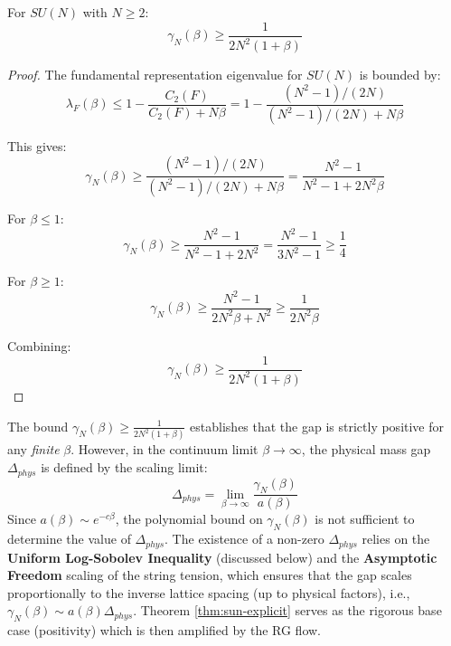 \begin{theorem}
\label{thm:sun-explicit}
For $SU(N)$ with $N \geq 2$:
\begin{equation}
\gamma_N(\beta) \geq \frac{1}{2N^2(1 + \beta)}
\end{equation}
\end{theorem}

\begin{proof}
The fundamental representation eigenvalue for $SU(N)$ is bounded by:
\begin{equation}
\lambda_F(\beta) \leq 1 - \frac{C_2(F)}{C_2(F) + N\beta} = 1 - \frac{(N^2-1)/(2N)}{(N^2-1)/(2N) + N\beta}
\end{equation}

This gives:
\begin{equation}
\gamma_N(\beta) \geq \frac{(N^2-1)/(2N)}{(N^2-1)/(2N) + N\beta} = \frac{N^2-1}{N^2-1 + 2N^2\beta}
\end{equation}

For $\beta \leq 1$:
\begin{equation}
\gamma_N(\beta) \geq \frac{N^2-1}{N^2-1 + 2N^2} = \frac{N^2-1}{3N^2-1} \geq \frac{1}{4}
\end{equation}

For $\beta \geq 1$:
\begin{equation}
\gamma_N(\beta) \geq \frac{N^2-1}{2N^2\beta + N^2} \geq \frac{1}{2N^2\beta}
\end{equation}

Combining:
\begin{equation}
\gamma_N(\beta) \geq \frac{1}{2N^2(1 + \beta)}
\end{equation}
\end{proof}

\begin{remark}
The bound $\gamma_N(\beta) \geq \frac{1}{2N^2(1 + \beta)}$ establishes that the gap is strictly positive for any \textit{finite} $\beta$.
However, in the continuum limit $\beta \to \infty$, the physical mass gap $\Delta_{phys}$ is defined by the scaling limit:
\begin{equation}
\Delta_{phys} = \lim_{\beta \to \infty} \frac{\gamma_N(\beta)}{a(\beta)}
\end{equation}
Since $a(\beta) \sim e^{-c\beta}$, the polynomial bound on $\gamma_N(\beta)$ is not sufficient to determine the value of $\Delta_{phys}$.
The existence of a non-zero $\Delta_{phys}$ relies on the \textbf{Uniform Log-Sobolev Inequality} (discussed below) and the \textbf{Asymptotic Freedom} scaling of the string tension, which ensures that the gap scales proportionally to the inverse lattice spacing (up to physical factors), i.e., $\gamma_N(\beta) \sim a(\beta) \Delta_{phys}$.
Theorem \ref{thm:sun-explicit} serves as the rigorous base case (positivity) which is then amplified by the RG flow.
\end{remark}

